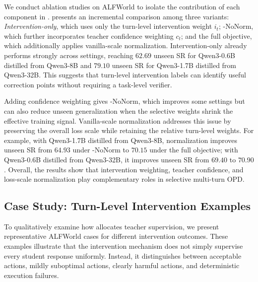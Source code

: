We conduct ablation studies on ALFWorld to isolate the contribution of each component in \ours{}.
%
 presents an incremental comparison among three variants: \textit{Intervention-only}, which uses only the turn-level intervention weight $i_t$; \ours{}-NoNorm, which further incorporates teacher confidence weighting $c_t$; and the full \ours{} objective, which additionally applies vanilla-scale normalization.
%
Intervention-only already performs strongly across settings, reaching $62.69$ unseen SR for Qwen3-0.6B distilled from Qwen3-8B and $79.10$ unseen SR for Qwen3-1.7B distilled from Qwen3-32B.
%
This suggests that turn-level intervention labels can identify useful correction points without requiring a task-level verifier.

Adding confidence weighting gives \ours{}-NoNorm, which improves some settings but can also reduce unseen generalization when the selective weights shrink the effective training signal.
%
Vanilla-scale normalization addresses this issue by preserving the overall loss scale while retaining the relative turn-level weights.
%
For example, with Qwen3-1.7B distilled from Qwen3-8B, normalization improves unseen SR from $64.93$ under \ours{}-NoNorm to $70.15$ under the full \ours{} objective; with Qwen3-0.6B distilled from Qwen3-32B, it improves unseen SR from $69.40$ to $70.90$.
%
Overall, the results show that intervention weighting, teacher confidence, and loss-scale normalization play complementary roles in selective multi-turn OPD.

\subsection{Case Study: Turn-Level Intervention Examples}
\label{sec:case_study}

To qualitatively examine how \ours{} allocates teacher supervision, we present representative ALFWorld cases for different intervention outcomes.
%
These examples illustrate that the intervention mechanism does not simply supervise every student response uniformly.
%
Instead, it distinguishes between acceptable actions, mildly suboptimal actions, clearly harmful actions, and deterministic execution failures.

